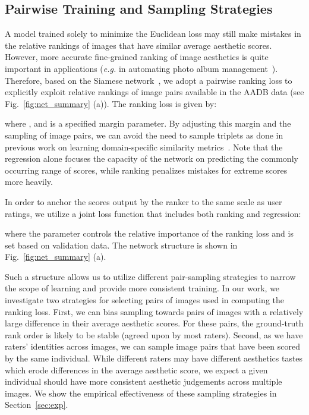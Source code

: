 \documentclass[runningheads]{llncs}
\def\eg{\emph{e.g. }}
\begin{document}
\subsection{Pairwise Training and Sampling Strategies}
\label{ssec:rankloss}
A model trained solely to minimize the Euclidean loss may still make mistakes
in the relative rankings of images that have similar average aesthetic scores.
However, more accurate fine-grained ranking of image aesthetics is quite
important in applications (\eg in automating photo album
management~\cite{cui2007easyalbum}).
Therefore,
based on the Siamese network~\cite{chopra2005learning},
we adopt a pairwise ranking loss to explicitly exploit relative rankings of image pairs
available in the AADB data (see Fig.~\ref{fig:net_summary} (a)).  The ranking loss is
given by:

where ,
and  is a specified margin parameter. By adjusting this margin and
the sampling of image pairs, we can avoid the need to sample triplets as done
in previous work on learning domain-specific similarity
metrics~\cite{chopra2005learning,wang2014learning,schroff2015facenet}.
Note that the regression alone focuses the capacity of the network on predicting the commonly occurring range of
scores,
while ranking penalizes mistakes for extreme scores more heavily.

In order to anchor the scores output by the ranker to the same scale as
user ratings, we utilize a joint loss function that includes both ranking
and regression:

where the parameter  controls the relative importance of the ranking loss and is
set based on validation data. The network structure is shown in Fig.~\ref{fig:net_summary} (a).

Such a structure allows us to utilize different pair-sampling strategies to narrow the scope of learning and provide more consistent training.
In our work,
we investigate two strategies for selecting pairs of
images used in computing the ranking loss.
First, we can bias sampling towards
pairs of images with a relatively large difference in their average aesthetic scores.
For these pairs, the ground-truth rank order is likely to be stable (agreed
upon by most raters).  Second, as we have raters' identities across images, we
can sample image pairs that have been scored by the same individual.
While different raters may have different aesthetics tastes which erode differences
in the average aesthetic score, we expect a given individual should have more
consistent aesthetic judgements across multiple images.  We show the empirical
effectiveness of these sampling strategies in Section~\ref{sec:exp}.
\end{document}

